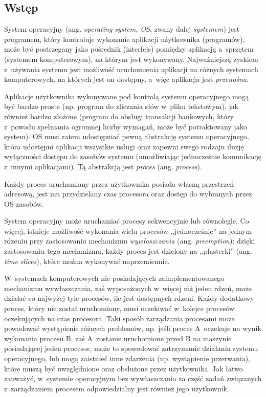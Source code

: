 \documentclass[12pt]{mwart}
\begin{document}
\subsection{Wstęp}
\indent
	System operacyjny (ang. \emph{operating system, OS}, zwany dalej \emph{systemem}) jest programem, 
	który kontroluje wykonanie aplikacji użytkownika (programów),
	może być postrzegany jako pośrednik (interfejs) pomiędzy aplikacją a~sprzętem (systemem komputerowym), na którym jest wykonywany.
	Najważniejszą zyskiem z~używania systemu jest możliwość uruchomienia aplikacji na różnych systemach komputerowych, na których
	jest on dostępny, a~więc aplikacja jest \emph{przenośna}.
\par
%
\indent
	Aplikacje użytkownika wykonywane pod kontrolą systemu operacyjnego mogą być bardzo proste (np. program do zliczania słów w~pliku tekstowym),
	jak również bardzo złożone (program do obsługi transakcji bankowych, który z~powodu spełniania ogromnej liczby wymagań, może być potraktowany jako
	system). OS musi zatem udostępniać pewną abstrakcję systemu operacyjnego, która udostępni aplikacji wszystkie usługi oraz zapewni swego
	rodzaju iluzję wyłączności dostępu do zasobów systemu (umożliwiając jednocześnie komunikację z~innymi aplikacjami).
	Tą abstrakcją jest \emph{proces} (ang. \emph{process}).
\par
%
\indent
  Każdy proces uruchamiany przez użytkownika posiada własną przestrzeń adresową, jest mu przydzielany czas procesora oraz dostęp do
  wybranych przez OS zasobów.
\par
%
\indent
  System operacyjny może uruchamiać procesy sekwencyjnie lub równolegle.
  Co więcej, istnieje możliwość wykonania wielu procesów ,,jednocześnie'' na jednym rdzeniu przy zastosowaniu mechanizmu \emph{wywłaszczania}
  (ang. \emph{preemption}): dzięki zastosowaniu tego mechanizmu, każdy proces jest dzielony na ,,plasterki'' (ang. \emph{time slices}),
  które można wykonywać naprzemiennie.
\par
%
\indent
  W~systemach komputerowych nie posiadających zaimplementowanego mechanizmu wywłaszczania, 
  zaś wyposażonych w~więcej niż jeden rdzeń, może działać co najwyżej tyle procesów, ile jest dostępnych rdzeni.
  Każdy dodatkowy proces, który nie został uruchomiony, musi oczekiwać w~kolejce procesów oczekujących na czas procesora.
  Taki sposób zarządzania procesami może powodować wystąpienie różnych problemów, np. jeśli proces A~oczekuje na wynik wykonania procesu B,
  zaś A~zostanie uruchomione przed B na maszynie posiadającej jeden procesor, może to spowodować zatrzymanie działania systemu operacyjnego,
  lub mogą zaistnieć inne zdarzenia (np. wystąpienie przerwania), które muszą być uwzględnione oraz obsłużone
  przez użytkownika. Jak łatwo zauważyć, w~systemie operacyjnym bez wywłaszczania
  za część zadań związanych z~zarządzaniem procesem odpowiedzialny jest również jego użytkownik.
\par
%
\indent
  
\end{document}
